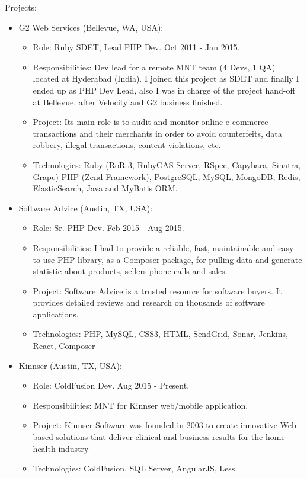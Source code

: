 \documentclass[11pt,a4paper,sans]{moderncv}        %
\begin{document}
  {
    Projects:\\
    \begin{itemize}
      \item G2 Web Services (Bellevue, WA, USA):
        \begin{itemize}
          \item Role: Ruby SDET, Lead PHP Dev. Oct 2011 - Jan 2015.
          \item Responsibilities: Dev lead for a remote MNT team (4 Devs, 1 QA) located at Hyderabad (India). I joined this project as SDET and finally I ended up as PHP Dev Lead, also I was in charge of the project hand-off at Bellevue, after Velocity and G2 business finished.
          \item Project: Its main role is to audit and monitor online e-commerce transactions and their merchants in order to avoid counterfeits, data robbery, illegal transactions, content violations, etc.
          \item Technologies: Ruby (RoR 3, RubyCAS-Server, RSpec, Capybara, Sinatra, Grape) PHP (Zend Framework), PostgreSQL, MySQL, MongoDB, Redis, ElasticSearch, Java and MyBatis ORM.
        \end{itemize}
      \item Software Advice (Austin, TX, USA):
       \begin{itemize}
          \item Role: Sr. PHP Dev. Feb 2015 - Aug 2015.
          \item Responsibilities: I had to provide a reliable, fast, maintainable and easy to use PHP library, as a Composer package, for pulling data and generate statistic about products, sellers phone calls and sales.
          \item Project: Software Advice is a trusted resource for software buyers. It provides detailed reviews and research on thousands of software applications.
          \item Technologies: PHP, MySQL, CSS3, HTML, SendGrid, Sonar, Jenkins, React, Composer
        \end{itemize}
      \item Kinnser (Austin, TX, USA):
       \begin{itemize}
          \item Role: ColdFusion Dev. Aug 2015 - Present.
          \item Responsibilities: MNT for Kinnser web/mobile application.
          \item Project: Kinnser Software was founded in 2003 to create innovative Web-based solutions that deliver clinical and business results for the home health industry
          \item Technologies: ColdFusion, SQL Server, AngularJS, Less.
        \end{itemize}
    \end{itemize}
  }
\end{document}
